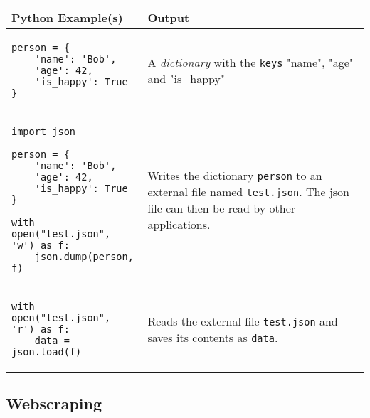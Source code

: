 \documentclass[11pt,a4paper]{report}
\begin{document}
\begin{longtable}{|p{}|p{}|}
\hline
Python  Example(s) & Output  \\
\hline 
\endhead 
 \begin{lstlisting}
person = {
    'name': 'Bob',
    'age': 42,
    'is_happy': True
}
\end{lstlisting}  &  A \emph{dictionary} with the \verb|keys| "name", "age" and "is\_happy" \\
\hline
\begin{lstlisting}
import json

person = {
    'name': 'Bob',
    'age': 42,
    'is_happy': True
}

with open("test.json", 'w') as f:
    json.dump(person, f)
\end{lstlisting} & Writes the dictionary \verb|person| to an external file named \verb|test.json|. The json file can then be read by other applications. \\
\hline

\begin{lstlisting}
with open("test.json", 'r') as f:
    data = json.load(f)
\end{lstlisting} & Reads the external file \verb|test.json| and saves its contents as \verb|data|. \\
\hline


\end{longtable}



\subsection{Webscraping}
\end{document}
